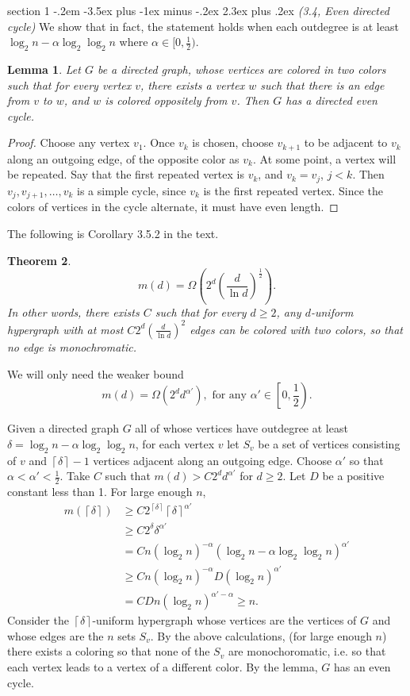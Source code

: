\documentclass[12pt]{article}
\makeatletter
\theoremstyle{norm}
\newtheorem{thm}{Theorem}[section]
\newtheorem{lem}[thm]{Lemma}
\newcommand{\rc}[1]{\frac{1}{#1}}
\newcommand{\al}[0]{\alpha}
\newcommand{\de}[0]{\delta}
\newcommand{\Om}[0]{\Omega}
\newcommand{\pa}[1]{\left( {#1} \right)}
\newcommand{\ce}[1]{\left\lceil {#1}\right\rceil}
\newcommand{\pf}[2]{\pa{\frac{#1}{#2}}}
\newenvironment{problem}{\@startsection
       {section}
       {1}
       {-.2em}
       {-3.5ex plus -1ex minus -.2ex}
       {2.3ex plus .2ex}
       {\pagebreak[3]%
       \large\bf\noindent{Problem }
       }
       }
       {%
       }
\makeatother
\begin{document}
\begin{problem} {\it (3.4, Even directed cycle)}
We show that in fact, the statement holds when each outdegree is at least $\log_2n-\al \log_2\log_2 n$ where $\al\in[0,\rc 2)$.
\begin{lem}
Let $G$ be a directed graph, whose vertices are colored in two colors such that for every vertex $v$, there exists a vertex $w$ such that there is an edge from $v$ to $w$, and $w$ is colored oppositely from $v$. Then $G$ has a directed even cycle.
\end{lem}
\begin{proof}
Choose any vertex $v_1$. Once $v_k$ is chosen, choose $v_{k+1}$ to be adjacent to $v_k$ along an outgoing edge, of the opposite color as $v_k$. At some point, a vertex will be repeated. Say that the first repeated vertex is $v_k$, and $v_k=v_j$, $j<k$. Then $v_j,v_{j+1},\ldots, v_k$ is a simple cycle, since $v_k$ is the first repeated vertex. Since the colors of vertices in the cycle alternate, it must have even length.
\end{proof}
The following is Corollary 3.5.2 in the text.
\begin{thm}
\[m(d)=\Om\pa{2^d\pf{d}{\ln d}^{\rc2}}.\]
In other words, there exists $C$ such that for every $d\ge 2$, any $d$-uniform hypergraph with at most $C2^d\pf{d}{\ln d}^2$ edges can be colored with two colors, so that no edge is monochromatic.
\end{thm}
We will only need the weaker bound
\[
m(d)=\Om\pa{2^dd^{\al'}},\text{ for any }\al'\in\left[0,\rc 2\right).
\]

Given a directed graph $G$ all of whose vertices have outdegree at least $\de=\log_2n-\al\log_2\log_2n$, for each vertex $v$ let $S_v$ be a set of vertices consisting of $v$ and $\ce{\de}-1$ vertices adjacent along an outgoing edge. Choose $\al'$ so that $\al<\al'<\rc 2$.
Take $C$ such that $m(d)>C2^dd^{\al'}$ for $d\ge 2$. Let $D$ be a positive constant less than 1. For large enough $n$, 
\begin{align*}
m(\ce{\de})&\ge C2^{\ce{\de}}\ce{\de}^{\al'}\\
&\ge C2^{\de} \de^{\al'}\\
&=Cn(\log_2 n)^{-\al} (\log_2 n-\al\log_2\log_2n)^{\al'}\\
&\ge Cn(\log_2 n)^{-\al} D(\log_2n)^{\al'}\\
&=CDn(\log_2 n)^{\al'-\al}\ge n.
\end{align*}
Consider the $\ce{\de}$-uniform hypergraph whose vertices are the vertices of $G$ and whose edges are the $n$ sets $S_v$. 
By the above calculations, (for large enough $n$) there exists a coloring so that none of the $S_v$ are monochoromatic, i.e. so that each vertex leads to a vertex of a different color. By the lemma, $G$ has an even cycle.
\end{problem}
\end{document}
